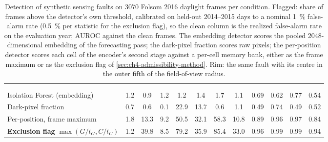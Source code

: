 \begin{table}[!t]
\caption[Detection of synthetic sensing faults.]{Detection of synthetic sensing faults on \num{3070} Folsom 2016 daylight frames per condition. Flagged: share of frames above the detector's own threshold, calibrated on held-out 2014--2015 days to a nominal \SI{1}{\percent} false-alarm rate (\SI{0.5}{\percent} per statistic for the exclusion flag), so the clean column is the realized false-alarm rate on the evaluation year; AUROC against the clean frames. The embedding detector scores the pooled \num{2048}-dimensional embedding of the forecasting pass; the dark-pixel fraction scores raw pixels; the per-position detector scores each cell of the encoder's second stage against a per-cell memory bank, either as the frame maximum or as the exclusion flag of \cref{sec:ch4-admissibility-method}. Rim: the same fault with its centre in the outer fifth of the field-of-view radius.}
\label{tab:ch4-detection}
\centering
\small
\TableTight
\begin{tabular}{l S[table-format=2.1] S[table-format=2.1] S[table-format=2.1] S[table-format=2.1] S[table-format=2.1] S[table-format=2.1] S[table-format=2.1] S[table-format=1.2] S[table-format=1.2] S[table-format=1.2] S[table-format=1.2]}
\toprule
 &  & \\
\cmidrule(lr){2-8}\cmidrule(lr){9-12}
 &  &  &  &  &  &  &  &  &  &  & \\
\midrule
Isolation Forest (embedding) & 1.2 & 0.9 & 1.2 & 1.2 & 1.4 & 1.7 & 1.1 & 0.69 & 0.62 & 0.77 & 0.54\\
Dark-pixel fraction & 0.7 & 0.6 & 0.1 & 22.9 & 13.7 & 0.6 & 1.1 & 0.49 & 0.74 & 0.49 & 0.52\\
Per-position, frame maximum & 1.8 & 13.3 & 9.2 & 50.5 & 32.1 & 58.3 & 10.8 & 0.89 & 0.96 & 0.97 & 0.84\\
\textbf{Exclusion flag} $\max(G/t_G, C/t_C)$ & 1.2 & 39.8 & 8.5 & 79.2 & 35.9 & 85.4 & 33.0 & 0.96 & 0.99 & 0.99 & 0.94\\
\bottomrule
\end{tabular}
\end{table}

